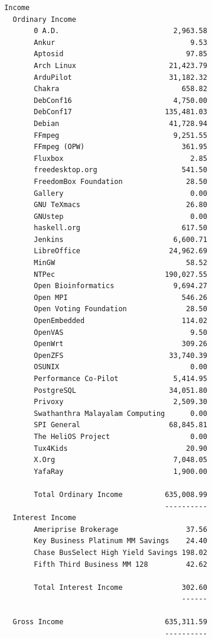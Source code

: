 \documentclass[a4paper]{report}
\begin{document}
\begin{verbatim}
 Income
   Ordinary Income
        0 A.D.                           2,963.58
        Ankur                                9.53
        Aptosid                             97.85
        Arch Linux                      21,423.79
        ArduPilot                       31,182.32
        Chakra                             658.82
        DebConf16                        4,750.00
        DebConf17                      135,481.03
        Debian                          41,728.94
        FFmpeg                           9,251.55
        FFmpeg (OPW)                       361.95
        Fluxbox                              2.85
        freedesktop.org                    541.50
        FreedomBox Foundation               28.50
        Gallery                              0.00
        GNU TeXmacs                         26.80
        GNUstep                              0.00
        haskell.org                        617.50
        Jenkins                          6,600.71
        LibreOffice                     24,962.69
        MinGW                               58.52
        NTPec                          190,027.55
        Open Bioinformatics              9,694.27
        Open MPI                           546.26
        Open Voting Foundation              28.50
        OpenEmbedded                       114.02
        OpenVAS                              9.50
        OpenWrt                            309.26
        OpenZFS                         33,740.39
        OSUNIX                               0.00
        Performance Co-Pilot             5,414.95
        PostgreSQL                      34,051.80
        Privoxy                          2,509.30
        Swathanthra Malayalam Computing      0.00
        SPI General                     68,845.81
        The HeliOS Project                   0.00
        Tux4Kids                            20.90
        X.Org                            7,048.05
        YafaRay                          1,900.00

        Total Ordinary Income          635,008.99
                                       ----------
   Interest Income
        Ameriprise Brokerage                37.56
        Key Business Platinum MM Savings    24.40
        Chase BusSelect High Yield Savings 198.02
        Fifth Third Business MM 128         42.62

        Total Interest Income              302.60
                                           ------

   Gross Income                        635,311.59
                                       ----------


\end{verbatim}
\end{document}
